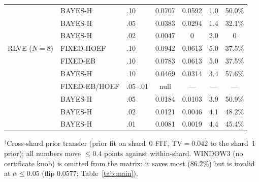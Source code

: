 \documentclass{article}
\theoremstyle{definition}
\theoremstyle{remark}
\begin{document}
\begin{table}[h]
\begin{tabular}{lllcccc}
                    & BAYES-H    & .10 & 0.0707 & 0.0592 & 1.0 & 50.0\% \\
                    & BAYES-H    & .05 & 0.0383 & 0.0294 & 1.4 & 32.1\% \\
                    & BAYES-H    & .02 & 0.0047 & 0 & 2.0 & 0 \\
\midrule
RLVE ($N{=}8$)      & FIXED-HOEF & .10 & 0.0942 & 0.0613 & 5.0 & 37.5\% \\
                    & FIXED-EB   & .10 & 0.0783 & 0.0613 & 5.0 & 37.5\% \\
                    & BAYES-H    & .10 & 0.0469 & 0.0314 & 3.4 & 57.6\% \\
                    & FIXED-EB/HOEF & .05--.01 & null & --- & --- & --- \\
                    & BAYES-H    & .05 & 0.0184 & 0.0103 & 3.9 & 50.9\% \\
                    & BAYES-H    & .02 & 0.0121 & 0.0046 & 4.1 & 48.2\% \\
                    & BAYES-H    & .01 & 0.0081 & 0.0019 & 4.4 & 45.4\% \\
\bottomrule
\end{tabular}
\vspace{2pt}
\begin{minipage}{\linewidth}\footnotesize
$^\dagger$Cross-shard prior transfer (prior fit on shard~0 FIT,
$\mathrm{TV}{=}0.042$ to the shard~1 prior); all numbers move ${\le}0.4$
points against within-shard. WINDOW3 (no certificate knob) is omitted from
the matrix: it saves most ($86.2\%$) but is invalid at $\alpha\le0.05$
(flip $0.0577$; Table~\ref{tab:main}).
\end{minipage}
\end{table}
\end{document}
